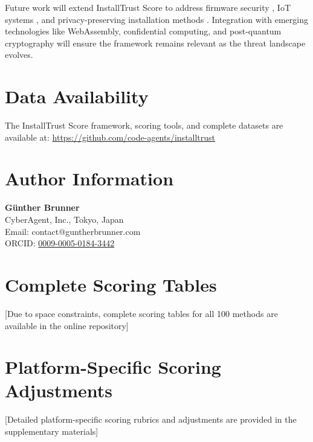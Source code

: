 \documentclass[11pt,a4paper]{article}
\begin{document}
Future work will extend InstallTrust Score to address firmware security \cite{nist2024firmware}, IoT systems \cite{kumar2024iot}, and privacy-preserving installation methods \cite{gdpr2018,ccpa2020}. Integration with emerging technologies like WebAssembly, confidential computing, and post-quantum cryptography will ensure the framework remains relevant as the threat landscape evolves.

\section*{Data Availability}
The InstallTrust Score framework, scoring tools, and complete datasets are available at: \url{https://github.com/code-agents/installtrust}

\section*{Author Information}
\noindent \textbf{Günther Brunner} \\
CyberAgent, Inc., Tokyo, Japan \\
Email: contact@guntherbrunner.com \\
ORCID: \href{https://orcid.org/0009-0005-0184-3442}{0009-0005-0184-3442}




\appendix

\section{Complete Scoring Tables}

[Due to space constraints, complete scoring tables for all 100 methods are available in the online repository]

\section{Platform-Specific Scoring Adjustments}

[Detailed platform-specific scoring rubrics and adjustments are provided in the supplementary materials]
\end{document}
